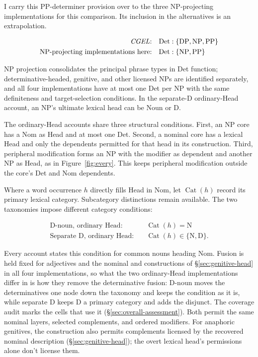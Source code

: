 \documentclass[12pt]{article}
\begin{document}
I carry this PP-determiner provision over to the three NP-projecting implementations for this comparison. Its inclusion in the alternatives is an extrapolation.

\[
\begin{aligned}
\text{\textit{CGEL}:} &\quad \mathrm{Det}:\{\mathrm{DP},\mathrm{NP},\mathrm{PP}\} \\
\text{NP-projecting implementations here:} &\quad \mathrm{Det}:\{\mathrm{NP},\mathrm{PP}\}
\end{aligned}
\]

NP projection consolidates the principal phrase types in Det function; determinative-headed, genitive, and other licensed NPs are identified separately, and all four implementations have at most one Det per NP with the same definiteness and target-selection conditions. In the separate-D ordinary-Head account, an NP's ultimate lexical head can be Noun or D.

The ordinary-Head accounts share three structural conditions. First, an NP core has a Nom as Head and at most one Det. Second, a nominal core has a lexical Head and only the dependents permitted for that head in its construction. Third, peripheral modification forms an NP with the modifier as dependent and another NP as Head, as in Figure~\ref{fig:every}. This keeps peripheral modification outside the core's Det and Nom dependents.

Where a word occurrence $h$ directly fills Head in Nom, let $\operatorname{Cat}(h)$ record its primary lexical category. Subcategory distinctions remain available. The two taxonomies impose different category conditions:

\[
\begin{aligned}
\text{D-noun, ordinary Head:} &\quad \operatorname{Cat}(h)=\mathrm{N} \\
\text{Separate D, ordinary Head:} &\quad \operatorname{Cat}(h)\in\{\mathrm{N},\mathrm{D}\}.
\end{aligned}
\]

Every account states this condition for common nouns heading Nom. Fusion is held fixed for adjectives and the nominal  and  constructions of §\ref{sec:genitive-head} in all four implementations, so what the two ordinary-Head implementations differ in is how they remove the determinative fusion: D-noun moves the determinatives one node down the taxonomy and keeps the condition as it is, while separate D keeps D a primary category and adds the disjunct. The coverage audit marks the cells that use it (§\ref{sec:overall-assessment}). Both permit the same nominal layers, selected complements, and ordered modifiers. For anaphoric genitives, the construction also permits complements licensed by the recovered nominal description (§\ref{sec:genitive-head}); the overt lexical head's permissions alone don't license them.
\end{document}
